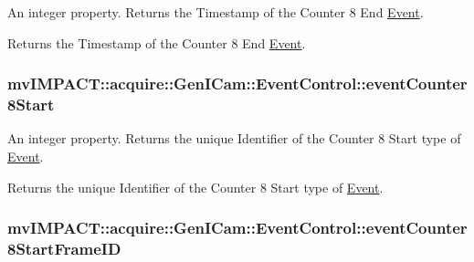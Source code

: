 An integer property. Returns the Timestamp of the Counter 8 End \hyperlink{classmv_i_m_p_a_c_t_1_1acquire_1_1_event}{Event}. 

Returns the Timestamp of the Counter 8 End \hyperlink{classmv_i_m_p_a_c_t_1_1acquire_1_1_event}{Event}. \hypertarget{classmv_i_m_p_a_c_t_1_1acquire_1_1_gen_i_cam_1_1_event_control_a8590f2982a5276b021b6a72b1c6c46ff}{
\subsubsection[{event\+Counter8\+Start}]{ mv\+I\+M\+P\+A\+C\+T\+::acquire\+::\+Gen\+I\+Cam\+::\+Event\+Control\+::event\+Counter8\+Start}}\label{classmv_i_m_p_a_c_t_1_1acquire_1_1_gen_i_cam_1_1_event_control_a8590f2982a5276b021b6a72b1c6c46ff}


An integer property. Returns the unique Identifier of the Counter 8 Start type of \hyperlink{classmv_i_m_p_a_c_t_1_1acquire_1_1_event}{Event}. 

Returns the unique Identifier of the Counter 8 Start type of \hyperlink{classmv_i_m_p_a_c_t_1_1acquire_1_1_event}{Event}. \hypertarget{classmv_i_m_p_a_c_t_1_1acquire_1_1_gen_i_cam_1_1_event_control_a0e53e32cbfe7d6359278d194bef61dd7}{
\subsubsection[{event\+Counter8\+Start\+Frame\+I\+D}]{ mv\+I\+M\+P\+A\+C\+T\+::acquire\+::\+Gen\+I\+Cam\+::\+Event\+Control\+::event\+Counter8\+Start\+Frame\+I\+D}}\label{classmv_i_m_p_a_c_t_1_1acquire_1_1_gen_i_cam_1_1_event_control_a0e53e32cbfe7d6359278d194bef61dd7}


